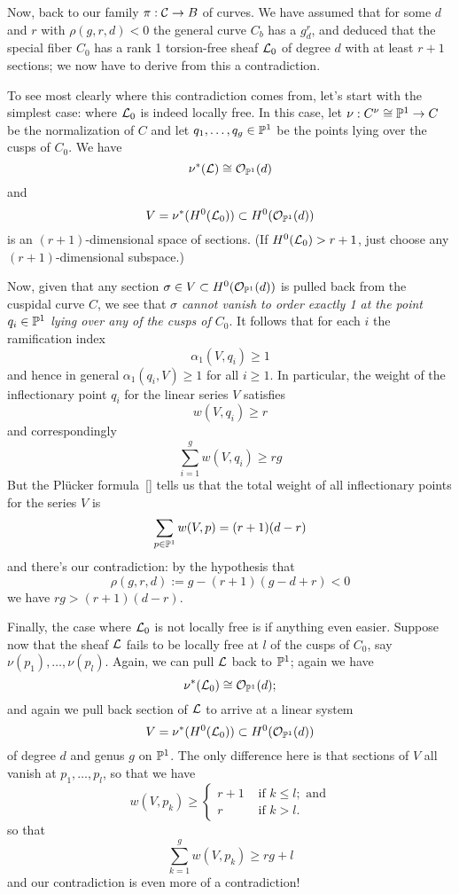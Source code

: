 
Now, back to our family $\pi : \mathcal C \to B$ of curves. We have assumed that for some $d$ and $r$ with $\rho(g,r,d) < 0$ the general curve $C_b$ has a $g^r_d$, and deduced that the special fiber $C_0$ has a rank 1 torsion-free sheaf ${\mathcal L}_0$ of degree $d$ with at least $r+1$ sections; we now have to derive from this a contradiction.

To see most clearly where this contradiction comes from, let's start with the simplest case: where ${\mathcal L}_0$ is indeed locally free. In this case, let $\nu :  C^\nu \cong {\mathbb P}^1 \to C$ be the normalization of $C$ and let $q_1,\dots, q_g \in {\mathbb P}^1$ be the points lying over the cusps of $C_0$. We have
$$
\nu^*({\mathcal L}) \cong {\mathcal O}_{{\mathbb P}^1}(d)
$$  
and 
$$
V = \nu^*(H^0({\mathcal L}_0)) \subset H^0({\mathcal O}_{{\mathbb P}^1}(d))
$$
is an $(r+1)$-dimensional space of sections. (If $H^0({\mathcal L}_0) > r+1$, just choose any $(r+1)$-dimensional subspace.) 

Now, given that any section $\sigma \in V \subset H^0({\mathcal O}_{{\mathbb P}^1}(d))$ is pulled back from the cuspidal curve $C$, we see that \emph{$\sigma$ cannot vanish to order exactly 1 at the point $q_i \in {\mathbb P}^1$ lying over any of the cusps of $C_0$}. It follows that for each $i$ the ramification index 
$$
\alpha_1(V,q_i) \geq 1 
$$
and hence in  general $\alpha_1(q_i,V) \geq 1$ for all $i \geq 1$. In particular, the weight of the inflectionary point $q_i$ for the linear series $V$ satisfies
$$
w(V, q_i) \geq r
$$
and correspondingly
$$
\sum_{i=1}^g w(V, q_i) \geq rg
$$
But the Pl\"ucker formula~\ref{} tells us that the total weight of all inflectionary points for the series $V$ is
$$
\sum_{p \in {\mathbb P}^1} w(V,p) = (r+1)(d-r)
$$
and there's our contradiction: by the hypothesis that 
$$
\rho(g,r,d) := g - (r+1)(g-d+r) < 0
$$
we have $rg > (r+1)(d-r)$.

Finally, the case where ${\mathcal L}_0$ is not locally free is if anything even easier. Suppose now that the sheaf ${\mathcal L}$ fails to be locally free at $l$ of the cusps of $C_0$, say $\nu(p_1),\dots,\nu(p_l)$. Again, we can pull ${\mathcal L}$ back to ${\mathbb P}^1$; again we have
$$
\nu^*({\mathcal L}_0) \cong {\mathcal O}_{{\mathbb P}^1}(d);
$$  
and again we pull back section of ${\mathcal L}$ to arrive at a linear system
$$
V = \nu^*(H^0({\mathcal L}_0)) \subset H^0({\mathcal O}_{{\mathbb P}^1}(d))
$$
of degree $d$ and genus $g$ on ${\mathbb P}^1$. The only difference here is that sections of $V$ all vanish at $p_1,\dots,p_l$, so that we have
$$
w(V,p_k) \geq 
\begin{cases}
r+1 &\text{ if } k \leq l; \text{ and} \\
r  &\text{ if } k > l.
\end{cases}
$$
so that
$$
\sum_{k=1}^g w(V, p_k) \geq rg + l
$$
and our contradiction is even more of a contradiction!

